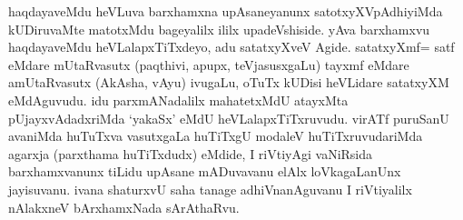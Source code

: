 \begin{artha}
haqdayaveMdu heVLuva barxhamxna upAsaneyanunx satotxyXVpAdhiyiMda kUDiruvaMte matotxMdu bageyalilx ililx upadeVshiside. yAva barxhamxvu haqdayaveMdu heVLalapxTiTxdeyo, adu satatxyXveV Agide.  satatxyXmf= satf eMdare mUtaRvasutx (paqthivi, apupx, teVjasusxgaLu) tayxmf eMdare amUtaRvasutx (AkAsha, vAyu) ivugaLu, oTuTx kUDisi heVLidare satatxyXM eMdAguvudu. idu parxmANadalilx mahatetxMdU atayxMta pUjayxvAdadxriMda `yakaSx' eMdU heVLalapxTiTxruvudu. virATf puruSanU avaniMda huTuTxva vasutxgaLa huTiTxgU modaleV huTiTxruvudariMda agarxja (parxthama huTiTxdudx) eMdide, I riVtiyAgi vaNiRsida barxhamxvanunx tiLidu upAsane mADuvavanu elAlx loVkagaLanUnx jayisuvanu. ivana shaturxvU saha tanage adhiVnanAguvanu I riVtiyalilx nAlakxneV bArxhamxNada sArAthaRvu.
\end{artha}



